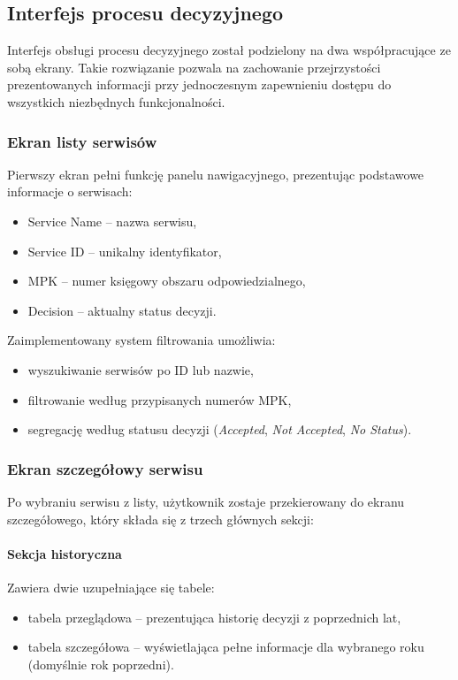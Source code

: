 \subsection{Interfejs procesu decyzyjnego}

Interfejs obsługi procesu decyzyjnego został podzielony na dwa współpracujące ze sobą ekrany. Takie rozwiązanie pozwala na zachowanie przejrzystości prezentowanych informacji przy jednoczesnym zapewnieniu dostępu do wszystkich niezbędnych funkcjonalności.

\subsubsection{Ekran listy serwisów}
Pierwszy ekran pełni funkcję panelu nawigacyjnego, prezentując podstawowe informacje o serwisach:
\begin{itemize}
    \item Service Name -- nazwa serwisu,
    \item Service ID -- unikalny identyfikator,
    \item MPK -- numer księgowy obszaru odpowiedzialnego,
    \item Decision -- aktualny status decyzji.
\end{itemize}

Zaimplementowany system filtrowania umożliwia:
\begin{itemize}
    \item wyszukiwanie serwisów po ID lub nazwie,
    \item filtrowanie według przypisanych numerów MPK,
    \item segregację według statusu decyzji (\emph{Accepted}, \emph{Not Accepted}, \emph{No Status}).
\end{itemize}

\subsubsection{Ekran szczegółowy serwisu}
Po wybraniu serwisu z listy, użytkownik zostaje przekierowany do ekranu szczegółowego, który składa się z trzech głównych sekcji:

\paragraph{Sekcja historyczna}
Zawiera dwie uzupełniające się tabele:
\begin{itemize}
    \item tabela przeglądowa -- prezentująca historię decyzji z poprzednich lat,
    \item tabela szczegółowa -- wyświetlająca pełne informacje dla wybranego roku (domyślnie rok poprzedni).
\end{itemize}

